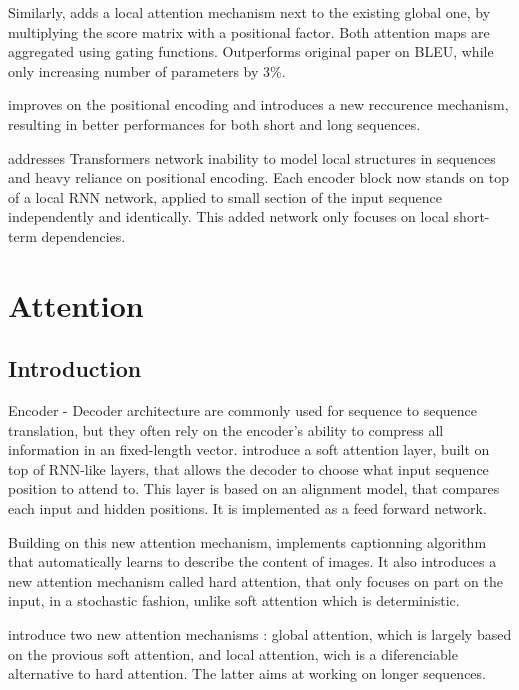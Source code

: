 \documentclass{article}
\begin{document}
    Similarly, \cite{Xu2019LeveragingLA} adds a local attention mechanism next to the existing global one, by multiplying the score matrix with a positional factor. Both attention maps are aggregated using gating functions. Outperforms original paper on BLEU, while only increasing number of parameters by 3\%.

    \cite[Transformer-XL]{Dai2019TransformerXLAL} improves on the positional encoding and introduces a new reccurence mechanism, resulting in better performances for both short and long sequences.

    \cite[R-Transformer]{Wang2019RTransformerRN} addresses Transformers network inability to model local structures in sequences and heavy reliance on positional encoding. Each encoder block now stands on top of a local RNN network, applied to small section of the input sequence independently and identically. This added network only focuses on local short-term dependencies.

    

\section{Attention}

    \subsection{Introduction}

    Encoder - Decoder architecture are commonly used for sequence to sequence translation, but they often rely on the encoder's ability to compress all information in an fixed-length vector. \cite{Bahdanau2014NeuralMT} introduce a soft attention layer, built on top of RNN-like layers, that allows the decoder to choose what input sequence position to attend to. This layer is based on an alignment model, that compares each input and hidden positions. It is implemented as a feed forward network.

    Building on this new attention mechanism, \cite{Xu2015ShowAA} implements captionning algorithm that automatically learns to describe the content of images. It also introduces a new attention mechanism called hard attention, that only focuses on part on the input, in a stochastic fashion, unlike soft attention which is deterministic.

    \cite{Luong2015EffectiveAT} introduce two new attention mechanisms : global attention, which is largely based on the provious soft attention, and local attention, wich is a diferenciable alternative to hard attention. The latter aims at working on longer sequences.
\end{document}
